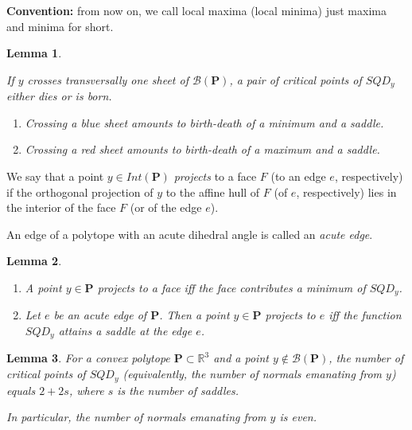 \documentclass[12pt]{amsart}
\newtheorem{lemma}{Lemma}
\newtheorem*{main lemma}{The main lemma}
\begin{document}
\textbf{Convention:}  from now on, we call local maxima (local minima) just maxima and minima for short.





\begin{lemma}\label{PropBifurc}

If $y$ crosses transversally one sheet of $\mathcal{B}(\mathbf{P})$, a pair of critical points of  $SQD_{y}$ either dies or is born.
\begin{enumerate}
  \item Crossing a blue sheet amounts to birth-death of a minimum and a saddle.
  \item Crossing a  red sheet amounts to birth-death of a maximum and a saddle.
\end{enumerate}
\end{lemma}




We say that a point $y\in Int(\mathbf{P})$ \textit{projects} to a face $F$ (to an edge $e$, respectively) if the orthogonal projection of $y$ to the affine hull of $F$ (of $e$, respectively) lies in the interior of the face $F$ (or of the edge $e$).


An edge of a polytope with an acute dihedral angle is called an \textit{acute edge}.


\begin{lemma}\label{LemmaSad}\begin{enumerate}  
                               \item A point $y\in \mathbf{P}$ projects to a face iff the face contributes a minimum of $SQD_y$.
                               \item  Let  $e$ be an acute edge of  $\mathbf{P}$. Then  a  point $y\in \mathbf{P}$ projects to $e$ iff the function $SQD_y$ attains a saddle  at the edge $e$.
                             \end{enumerate}
\end{lemma}




\begin{lemma}\label{LemmaSaddles} For a convex polytope $\mathbf{P}\subset \mathbb{R}^3$ and a  point $y\notin \mathcal{B}(\mathbf{P})$, the number of critical points of $SQD_y$ (equivalently, the number of normals emanating from $y$) equals $2+2s$,
   where $s$ is the number of saddles.
   
   In particular, the number of normals emanating from $y$ is even.


\end{lemma}
\end{document}
